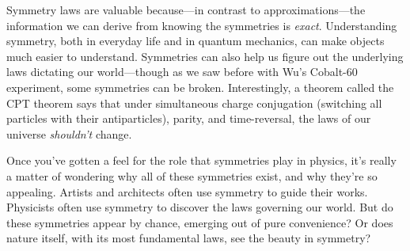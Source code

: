 Symmetry laws are valuable because---in contrast to approximations---the information we can derive from knowing the symmetries is \emph{exact}. Understanding symmetry, both in everyday life and in quantum mechanics, can make objects much easier to understand. Symmetries can also help us figure out the underlying laws dictating our world---though as we saw before with Wu's Cobalt-60 experiment, some symmetries can be broken. Interestingly, a theorem called the CPT theorem says that under simultaneous charge conjugation (switching all particles with their antiparticles), parity, and time-reversal, the laws of our universe \emph{shouldn't} change.

Once you've gotten a feel for the role that symmetries play in physics, it's really a matter of wondering why all of these symmetries exist, and why they're so appealing. Artists and architects often use symmetry to guide their works. Physicists often use symmetry to discover the laws governing our world. But do these symmetries appear by chance, emerging out of pure convenience? Or does nature itself, with its most fundamental laws, see the beauty in symmetry?

